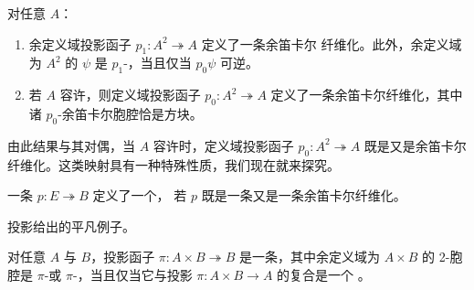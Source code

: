 \begin{proposition}[余定义域投影纤维化]\label{prop:projection-fibrations-cocartesian}
对任意\trInfinityCategory{} $A$：
\begin{enumerate}[label=(\roman*)]
\item 余定义域投影函子 $p_{1}\colon A^{2}\twoheadrightarrow A$ 定义了一条余笛卡尔
纤维化。此外，余定义域为 $A^{2}$ 的\trNaturalTransformation{} $\psi$ 是
$p_{1}$-\trCocartesian，当且仅当 $p_{0}\psi$ 可逆。
\item 若 $A$ 容许\trPushout，则定义域投影函子 $p_{0}\colon A^{2}\twoheadrightarrow A$
定义了一条余笛卡尔纤维化，其中诸 $p_{0}$-余笛卡尔胞腔恰是\trPushout{}方块。
\end{enumerate}
\end{proposition}

由此结果与其对偶，当 $A$ 容许\trPushout{}时，定义域投影函子
$p_{0}\colon A^{2}\twoheadrightarrow A$ 既是\trCartesianFibration{}又是余笛卡尔
纤维化。这类映射具有一种特殊性质，我们现在就来探究。

\begin{definition}[\trBifibration]\label{def:bifibration}
一条\trIsofibration{} $p\colon E\twoheadrightarrow B$ 定义了一个\textbf{\trBifibration}，
若 $p$ 既是一条\trCartesianFibration{}又是一条余笛卡尔纤维化。
\end{definition}

投影给出\trBifibration{}的平凡例子。

\begin{example}\label{exa:projection-bifibration}
对任意\trInfinityCategory{} $A$ 与 $B$，投影函子 $\pi\colon A\times B\twoheadrightarrow B$
是一条\trBifibration，其中余定义域为 $A\times B$ 的 2-胞腔是 $\pi$-\trCocartesian{}或
$\pi$-\trCartesian，当且仅当它与投影 $\pi\colon A\times B\to A$ 的复合是一个%
\trIsomorphism。
\end{example}

